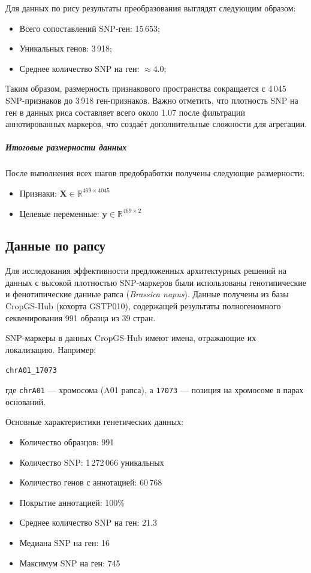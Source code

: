 Для данных по рису результаты преобразования выглядят следующим образом:
\begin{itemize}
	\item Всего сопоставлений SNP-ген: 15\,653;
	\item Уникальных генов: 3\,918;
	\item Среднее количество SNP на ген: $\approx 4.0$;
\end{itemize}
Таким образом, размерность признакового пространства сокращается с 4\,045 SNP-признаков до 3\,918 ген-признаков. Важно отметить, что плотность SNP на ген в данных риса составляет всего около 1.07 после фильтрации аннотированных маркеров, что создаёт дополнительные сложности для агрегации.

\subparagraph{Итоговые размерности данных}

После выполнения всех шагов предобработки получены следующие размерности:
\begin{itemize}
	\item Признаки: \(\mathbf{X} \in \mathbb{R}^{469 \times 4045}\)
	\item Целевые переменные: \(\mathbf{y} \in \mathbb{R}^{469 \times 2}\)
\end{itemize}
\subsection{Данные по рапсу}

Для исследования эффективности предложенных архитектурных решений на данных с высокой плотностью SNP-маркеров были использованы генотипические и фенотипические данные рапса (\textit{Brassica napus}). Данные получены из базы CropGS-Hub \cite{Chen2024} (кохорта GSTP010), содержащей результаты полногеномного секвенирования 991 образца из 39 стран.


SNP-маркеры в данных CropGS-Hub имеют имена, отражающие их локализацию. Например:
\begin{center}
	\texttt{chrA01\_17073}
\end{center}
где \texttt{chrA01} — хромосома (A01 рапса), а \texttt{17073} — позиция на хромосоме в парах оснований.

Основные характеристики генетических данных:
\begin{itemize}
	\item Количество образцов: 991
	\item Количество SNP: 1\,272\,066 уникальных
	\item Количество генов с аннотацией: 60\,768
	\item Покрытие аннотацией: 100\%
	\item Среднее количество SNP на ген: 21.3
	\item Медиана SNP на ген: 16
	\item Максимум SNP на ген: 745
\end{itemize}

